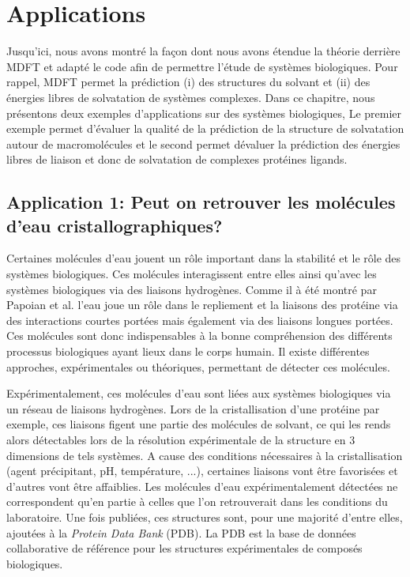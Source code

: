 \chapter{Applications}
\label{chap:applications}


Jusqu'ici, nous avons montré la façon dont nous avons étendue la théorie derrière MDFT et adapté le code afin de permettre l'étude de systèmes biologiques. Pour rappel, MDFT permet la prédiction (i) des structures du solvant et (ii) des énergies libres de solvatation de systèmes complexes. Dans ce chapitre, nous présentons deux exemples d'applications sur des systèmes biologiques, Le premier exemple permet d'évaluer la qualité de la prédiction de la structure de solvatation autour de macromolécules et le second permet dévaluer la prédiction des énergies libres de liaison et donc de solvatation de complexes protéines ligands.


\clearpage
\section{Application 1: Peut on retrouver les molécules d'eau cristallographiques?}
Certaines molécules d'eau jouent un rôle important dans la stabilité et le rôle des systèmes biologiques. Ces molécules interagissent entre elles ainsi qu'avec les systèmes biologiques via des liaisons hydrogènes. Comme il à été montré par Papoian et al. \cite{papoian_water_2004} l'eau joue un rôle dans le repliement et la liaisons des protéine via des interactions courtes portées mais également via des liaisons longues portées. Ces molécules sont donc indispensables à la bonne compréhension des différents processus biologiques ayant lieux dans le corps humain. Il existe différentes approches, expérimentales ou théoriques, permettant de détecter ces molécules.

Expérimentalement, ces molécules d'eau sont liées aux systèmes biologiques via un réseau de liaisons hydrogènes. Lors de la cristallisation d'une protéine par exemple, ces liaisons figent une partie des molécules de solvant, ce qui les rends alors détectables lors de la résolution expérimentale de la structure en 3 dimensions de tels systèmes. A cause des conditions nécessaires à la cristallisation \cite{wlodawer_advanced_2017} (agent précipitant, pH, température, ...), certaines liaisons vont être favorisées et d'autres vont être affaiblies. Les molécules d'eau expérimentalement détectées ne correspondent qu'en partie à celles que l'on retrouverait dans les conditions du laboratoire. Une fois publiées, ces structures sont, pour une majorité d'entre elles, ajoutées à la \textit{Protein Data Bank}\cite{pdb_2011} (PDB). La PDB est la base de données collaborative de référence pour les structures expérimentales de composés biologiques.

